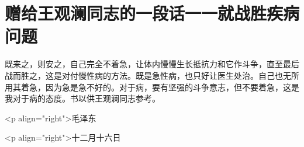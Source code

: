 \section[赠给王观澜同志的一段话一一就战胜疾病问题（一九四一年十二月十六日）]{赠给王观澜同志的一段话一一就战胜疾病问题}


既来之，则安之，自己完全不着急，让体内慢慢生长抵抗力和它作斗争，直至最后战而胜之，这是对付慢性病的方法。既是急性病，也只好让医生处治。自己也无所用其着急，因为急是急不好的。对于病，要有坚强的斗争意志，但不要着急，这是我对于病的态度。书以供王观澜同志参考。

<p align="right">毛泽东

<p align="right">十二月十六日

